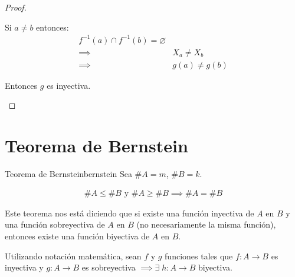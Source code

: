\begin{proof}
\begin{itemize}
        Si $a \neq b$ entonces:
        \begin{align*}
            f^{-1}(a) \cap f^{-1}(b) = \varnothing \\
            \implies& X_a \neq X_b \\
            \implies& g(a) \neq g(b)
        \end{align*}



        

        Entonces $g$ es inyectiva.
    \end{itemize}
\end{proof}



\section{Teorema de Bernstein}
\begin{teorema}{Teorema de Bernstein}{bernstein}
Sea $\#A = m$, $\#B = k$.

\begin{gather*}
    \# A \leq \# B \text{ y } \# A \geq \# B \implies \# A = \# B
\end{gather*}
\end{teorema}

Este teorema nos está diciendo que si existe una función inyectiva de $A$ en 
$B$ y una función sobreyectiva de $A$ en $B$ (no necesariamente la misma 
función), entonces existe una función biyectiva de $A$ en $B$.

Utilizando notación matemática, sean $f$ y $g$ funciones tales que 
$f: A\to B$ es inyectiva y $g: A \to B$ es sobreyectiva 
$\implies \exists \; h : A\to B$ biyectiva.

